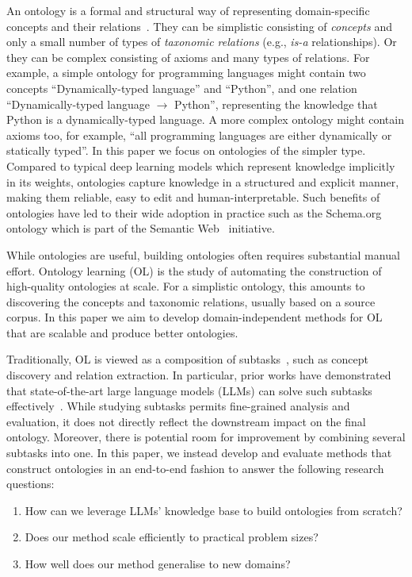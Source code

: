 \documentclass{article}
\begin{document}
An ontology is a formal and structural way of representing domain-specific concepts and their relations~\cite{gruber1995toward}.
They can be simplistic consisting of \emph{concepts} and only a small number of types of \emph{taxonomic relations} (e.g., \emph{is-a} relationships). Or they can be complex consisting of axioms and many types of relations. 
For example, a simple ontology for programming languages might contain two concepts ``Dynamically-typed language'' and ``Python'', and one relation ``Dynamically-typed language $\to$ Python'', representing the knowledge that Python is a dynamically-typed language. A more complex ontology might contain axioms too, for example, ``all programming languages are either dynamically or statically typed''.
In this paper we focus on ontologies of the simpler type. Compared to typical deep learning models which represent knowledge implicitly in its weights, ontologies capture knowledge in a structured and explicit manner, making them reliable, easy to edit and human-interpretable. Such benefits of ontologies have led to their wide adoption in practice such as the  Schema.org~\cite{Schema.org_2011} ontology which is part of the Semantic Web~\cite{antoniou2004semantic} initiative.

While ontologies are useful, building ontologies often requires substantial manual effort. Ontology learning (OL) is the study of automating the construction of high-quality ontologies at scale. For a simplistic ontology, this amounts to discovering the concepts and taxonomic relations, usually based on a source corpus. In this paper we aim to develop domain-independent methods for OL that are scalable and produce better ontologies.

Traditionally, OL is viewed as a composition of subtasks~\cite{asim2018survey}, such as concept discovery and relation extraction. In particular, prior works have demonstrated that state-of-the-art large language models (LLMs) can solve such subtasks effectively~\cite{babaei2023llms4ol}. While studying subtasks permits fine-grained analysis and evaluation, it does not directly reflect the downstream impact on the final ontology. Moreover, there is potential room for improvement by combining several subtasks into one. In this paper, we instead develop and evaluate methods that construct ontologies in an end-to-end fashion to answer the following research questions:
\begin{enumerate}
    \item How can we leverage LLMs' knowledge base to build ontologies from scratch?
    \item Does our method scale efficiently to practical problem sizes?
    \item How well does our method generalise to new domains?
\end{enumerate}
\end{document}
